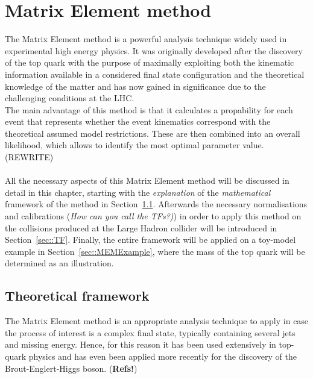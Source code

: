 \chapter{Matrix Element method} \label{ch::MW}

The Matrix Element method is a powerful analysis technique widely used in experimental high energy physics.
It was originally developed after the discovery of the top quark with the purpose of maximally exploiting both the kinematic information available in a considered final state configuration and the theoretical knowledge of the matter and has now gained in significance due to the challenging conditions at the LHC.
\\
The main advantage of this method is that it calculates a propability for each event that represents whether the event kinematics correspond with the theoretical assumed model restrictions. These are then combined into an overall likelihood, which allows to identify the most optimal parameter value. (REWRITE)
\\
\\
All the necessary aspects of this Matrix Element method will be discussed in detail in this chapter, starting with the \textit{explanation} of the \textit{mathematical} framework of the method in Section~\ref{sec::MWTheory}.
Afterwards the necessary normalisations and calibrations (\textit{How can you call the TFs?)}) in order to apply this method on the collisions produced at the Large Hadron collider will be introduced in Section~\ref{sec::TF}.
Finally, the entire framework will be applied on a toy-model example in Section~\ref{sec::MEMExample}, where the mass of the top quark will be determined as an illustration.

\section{Theoretical framework} \label{sec::MWTheory}

The Matrix Element method is an appropriate analysis technique to apply in case the process of interest is a complex final state, typically containing several jets and missing energy.
Hence, for this reason it has been used extensively in top-quark physics and has even been applied more recently for the discovery of the Brout-Englert-Higgs boson. (\textbf{Refs!})
\\

